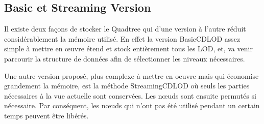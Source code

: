 \subsection{Basic et Streaming Version}

    Il existe deux façons de stocker le Quadtree qui d'une version à l'autre réduit considérablement la mémoire utilisé. En effet la version BasicCDLOD assez simple à mettre en \oe{}uvre étend et stock entièrement tous les LOD, et, va venir parcourir la structure de données afin de sélectionner les niveaux nécessaires.
   
    Une autre version proposé, plus complexe à mettre en oeuvre mais qui économise grandement la mémoire, est la méthode StreamingCDLOD où seuls les parties nécessaires à la vue actuelle sont conservées. Les n\oe{}uds sont ensuite permutés si nécessaire. Par conséquent, les n\oe{}uds qui n'ont pas été utilisé pendant un certain temps peuvent être libérés.